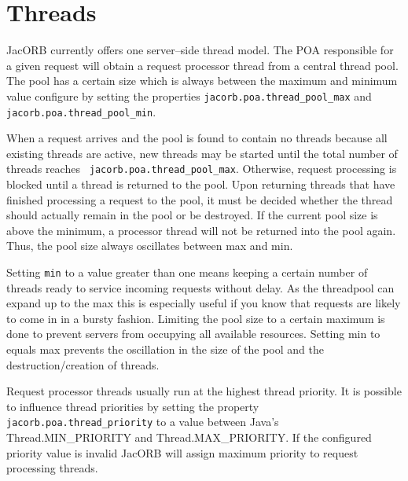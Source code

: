 \section{Threads}

JacORB  currently  offers  one   server--side  thread  model.  The  POA
responsible for a given request will obtain a request processor thread
from  a central  thread pool.  The pool  has a  certain size  which is
always between the maximum and  minimum value configure by setting the
properties     {\tt     jacorb.poa.thread\_pool\_max}     and     {\tt
jacorb.poa.thread\_pool\_min}.

When a  request arrives and  the pool is  found to contain  no threads
because all  existing threads are  active, new threads may  be started
until     the    total    number     of    threads     reaches    {\tt
jacorb.poa.thread\_pool\_max}. Otherwise,  request processing is blocked
until a  thread is returned to  the pool. Upon  returning threads that
have  finished processing a  request to  the pool,  it must  be decided
whether  the  thread  should  actually   remain  in  the  pool  or  be
destroyed. If the current pool  size is above the minimum, a processor
thread will not be returned into the pool again. Thus, the pool size always
oscillates between max and min.

Setting {\tt min} to a value greater than one means keeping a certain number of
threads ready to service incoming requests without delay. As the threadpool can
expand up to the max this is especially useful if you know that requests are
likely to come in in a bursty fashion.  Limiting the pool size to a certain
maximum is done to prevent servers from occupying all available
resources. Setting min to equals max prevents the oscillation in the size of the
pool and the destruction/creation of threads.

Request  processor   threads  usually   run  at  the   highest  thread
priority. It is possible to influence thread priorities by setting the
property  {\tt jacorb.poa.thread\_priority} to  a value  between Java's
Thread.MIN\_PRIORITY and Thread.MAX\_PRIORITY. If the configured priority
value  is  invalid JacORB  will  assign  maximum  priority to  request
processing threads.



